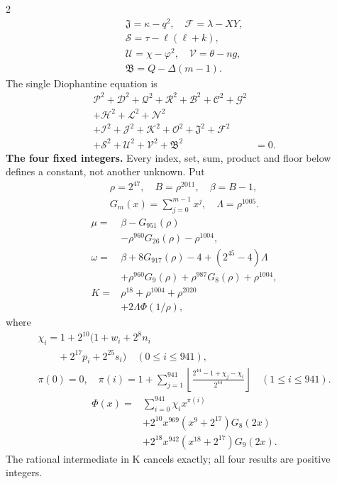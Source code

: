 \documentclass[10pt]{article}
\newcommand{\fl}[1]{\left\lfloor#1\right\rfloor}
\begin{document}
\begin{multicols}{2}
\[\begin{gathered}
\mathfrak{J}=\kappa-q^2,\quad\mathcal{F}=\lambda-XY,\\
\mathcal{S}=\tau-\ell(\ell+k),\\
\mathcal{U}=\chi-\varphi^2,\quad\mathcal{V}=\theta-ng,\\
\mathfrak{B}=Q-\Delta(m-1).
\end{gathered}
\]
The single Diophantine equation is
\[
\begin{split}
\mathcal{P}^2+\mathcal{D}^2+\mathcal{Q}^2+\mathcal{R}^2+\mathcal{B}^2+\mathcal{C}^2+\mathcal{G}^2 &\\
+\mathcal{H}^2+\mathcal{L}^2+\mathcal{N}^2 &\\
+\mathcal{I}^2+\mathcal{J}^2+\mathcal{K}^2+\mathcal{O}^2+\mathfrak{J}^2+\mathcal{F}^2 &\\
+\mathcal{S}^2+\mathcal{U}^2+\mathcal{V}^2+\mathfrak{B}^2 &= 0.
\end{split}
\]
\textbf{The four fixed integers.}
Every index, set, sum, product and floor below defines a constant, not
another unknown. Put
\[
\begin{gathered}
\rho=2^{47},\quad B=\rho^{2011},\quad\beta=B-1,\\
G_m(x)=\sum_{j=0}^{m-1}x^j,\quad
\Lambda=\rho^{1005}.
\end{gathered}
\]
\begin{align*}
\mu={}&\beta-G_{951}(\rho)\\
&-\rho^{960}G_{26}(\rho)-\rho^{1004},\\
\omega={}&\beta+8G_{917}(\rho)-4+(2^{45}-4)\Lambda\\
&+\rho^{960}G_9(\rho)+\rho^{987}G_8(\rho)
  +\rho^{1004},\\
K={}&\rho^{18}+\rho^{1004}+\rho^{2020}\\
&+2\Lambda\Phi(1/\rho),
\end{align*}
where
\[
\begin{gathered}
\chi_i=1+2^{10}(1+w_i+2^8n_i\\
\qquad+2^{17}p_i+2^{25}s_i)\quad(0\le i\le941),\\
\pi(0)=0,\quad\pi(i)=1+\sum_{j=1}^{941}
\fl{\frac{2^{44}-1+\chi_j-\chi_i}{2^{44}}}\quad(1\le i\le941).
\end{gathered}
\]
\[
\begin{split}
\Phi(x)={}&\sum_{i=0}^{941}\chi_i x^{\pi(i)}\\
&+2^{10}x^{969}(x^9+2^{17})G_8(2x)\\
&+2^{18}x^{942}(x^{18}+2^{17})G_9(2x).
\end{split}
\]
The rational intermediate in K cancels exactly; all four results are positive integers.


\end{multicols}
\end{document}
